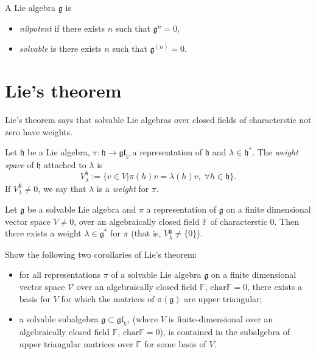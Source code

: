 \begin{definition}
\label{definition-nilpo-solva-lie-algeb}
A Lie algebra $\mathfrak{g}$ is
\begin{itemize}
\item {\it nilpotent} if there exists $n$
such that $\mathfrak{g}^n=0$,
\item {\it solvable} is there exists $n$ such
that $\mathfrak{g}^{(n)}=0$.
\end{itemize}
\end{definition}

\section{Lie's theorem}
\label{section-Lie-theorem}

Lie's theorem says that solvable Lie algebras
over closed fields of
characterstic not zero have weights.

\begin{definition}
\label{definition-weight-space}
Let $\mathfrak{h}$ be a Lie algebra,
$\pi:\mathfrak{h}\to\mathfrak{gl}_V$ a
representation of $\mathfrak{h}$
and $\lambda \in \mathfrak{h}^*$. The {\it
weight space} of $\mathfrak{h}$
attached to $\lambda$ is
$$
V_\lambda^{\mathfrak{h}}:=\{v \in
V|\pi(h)v=\lambda(h)v,\;
\forall h \in \mathfrak{h}\}.
$$
If $V_\lambda^{\mathfrak{h}}\neq 0$, we say
that $\lambda$ is a {\it weight} for
$\pi$.
\end{definition}

\begin{theorem}
\label{theorem-Lie}
Let $\mathfrak{g}$ be a solvable Lie algebra
and $\pi$ a representation of
$\mathfrak{g}$ on a finite dimensional vector
space $V \neq 0$, over an
algebraically closed field $\mathbb{F}$ of
characterstic 0.
Then there exists a weight $\lambda \in
\mathfrak{g}^*$ for $\pi$
(that is, $V_\lambda^\mathfrak{g} \neq
\{0\}$).
\end{theorem}

\begin{exercise}
\label{exercise-corollaries-of-Lie-theorem}
Show the following two corollaries of Lie's
theorem:
\begin{itemize}
\item for all representations $\pi$ of a
solvable Lie algebra $\mathfrak{g}$ on
a finite dimensional vector space
$\mathcal{V}$ over an algebraically closed
field $\mathbb{F}$,
$\text{char}\mathbb{F}=0$,
there exists a basis for $V$ for which the
matrices
of $\pi(\mathfrak{g})$ are upper triangular;
\item a solvable subalgebra $\mathfrak{g}
\subset \mathfrak{gl}_V$,
(where $V$ is finite-dimensional over an
algebraically closed field
$\mathbb{F}$, $\text{char}\mathbb{F}=0$),
is contained in the subalgebra of upper
triangular matrices
over $\mathbb{F}$ for some basis of $V$.
\end{itemize}
\end{exercise}

